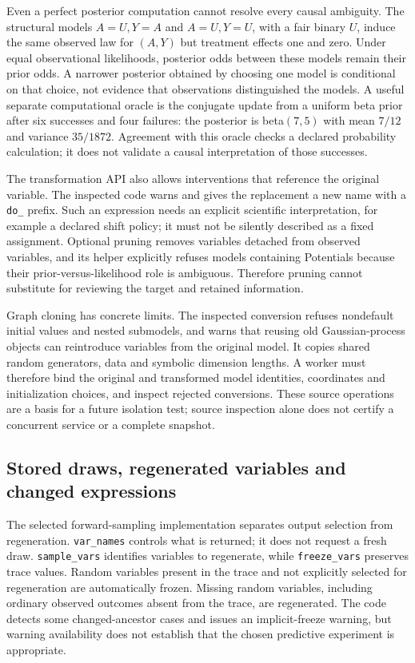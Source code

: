 Even a perfect posterior computation cannot resolve every causal ambiguity.
The structural models $A=U,Y=A$ and $A=U,Y=U$, with a fair binary $U$, induce
the same observed law for $(A,Y)$ but treatment effects one and zero.
Under equal observational likelihoods, posterior odds between these models
remain their prior odds. A narrower posterior obtained by choosing one model
is conditional on that choice, not evidence that observations distinguished
the models. A useful separate computational oracle is the conjugate update
from a uniform beta prior after six successes and four failures: the posterior
is beta$(7,5)$ with mean $7/12$ and variance $35/1872$. Agreement with this
oracle checks a declared probability calculation; it does not validate a
causal interpretation of those successes.
\citep{exec23_pymc_reference}

The transformation API also allows interventions that reference the original
variable. The inspected code warns and gives the replacement a new name with
a \texttt{do\_} prefix. Such an expression needs an explicit scientific
interpretation, for example a declared shift policy; it must not be silently
described as a fixed assignment. Optional pruning removes variables detached
from observed variables, and its helper explicitly refuses models containing
Potentials because their prior-versus-likelihood role is ambiguous. Therefore
pruning cannot substitute for reviewing the target and retained information.
\citep{exec23_pymc_sources}

Graph cloning has concrete limits. The inspected conversion refuses
nondefault initial values and nested submodels, and warns that reusing old
Gaussian-process objects can reintroduce variables from the original model.
It copies shared random generators, data and symbolic dimension lengths.
A worker must therefore bind the original and transformed model identities,
coordinates and initialization choices, and inspect rejected conversions.
These source operations are a basis for a future isolation test; source
inspection alone does not certify a concurrent service or a complete snapshot.
\citep{exec23_pymc_sources}

\subsection{Stored draws, regenerated variables and changed expressions}
\label{exec23:pymc-prediction}

The selected forward-sampling implementation separates output selection from
regeneration. \texttt{var\_names} controls what is returned; it does not request
a fresh draw. \texttt{sample\_vars} identifies variables to regenerate, while
\texttt{freeze\_vars} preserves trace values. Random variables present in the
trace and not explicitly selected for regeneration are automatically frozen.
Missing random variables, including ordinary observed outcomes absent from
the trace, are regenerated. The code detects some changed-ancestor cases and
issues an implicit-freeze warning, but warning availability does not establish
that the chosen predictive experiment is appropriate.
\citep{exec23_pymc_sources}

